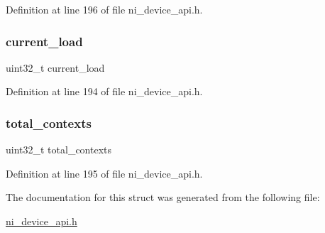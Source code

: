 Definition at line 196 of file ni\+\_\+device\+\_\+api.\+h.

\mbox{\label{struct__ni__load__query_aa202e51accad981236be649818f2d8c3}} 
\subsubsection{\texorpdfstring{current\_load}{current\_load}}
{\footnotesize\ttfamily uint32\+\_\+t current\+\_\+load}



Definition at line 194 of file ni\+\_\+device\+\_\+api.\+h.

\mbox{\label{struct__ni__load__query_aa6bfe140287adba7005862a782545669}} 
\subsubsection{\texorpdfstring{total\_contexts}{total\_contexts}}
{\footnotesize\ttfamily uint32\+\_\+t total\+\_\+contexts}



Definition at line 195 of file ni\+\_\+device\+\_\+api.\+h.



The documentation for this struct was generated from the following file\+:\begin{DoxyCompactItemize}
\item 
\mbox{\hyperlink{ni__device__api_8h}{ni\+\_\+device\+\_\+api.\+h}}\end{DoxyCompactItemize}
